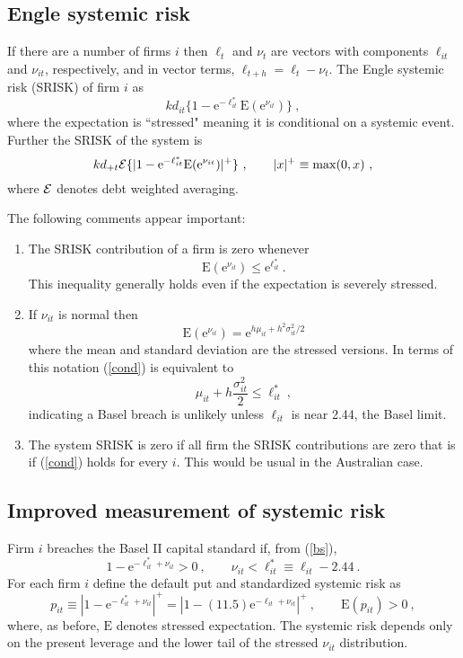 \documentclass[authoryear]{elsarticle}
\newcommand{\E}{\mathrm{E}}
\newcommand{\e}{\mathrm{e}}
\newcommand{\Ex}{{\cal E}}
\newcommand{\eref}[1]{(\ref{#1})}
\newcommand{\cq}{\ , \qquad}
\newcommand{\be}[1]{\begin{equation}\label{#1}}
\newcommand{\ee}{\end{equation}}
\begin{document}
\subsection{Engle systemic risk}
If there are a number of  firms $i$ then $\ell_t$ and $\nu_t$ are  vectors with components $\ell_{it}$ and $\nu_{it}$, respectively, and in vector terms, $\ell_{t+h}=\ell_t - \nu_t$.   The Engle systemic risk (SRISK) of  firm $i$ as 
\be{esrisk}
 kd_{it}\{1-\e^{-\ell^*_{it}}\E(\e^{\nu_{it}})\}\ ,
\ee
where the expectation is ``stressed" meaning it is conditional on a systemic event.  Further the SRISK of the system is
\be{essrisk}
kd_{+t}\Ex\{|1-\e^{-\ell^*_{it}}\E(\e^{\nu_{it}})|^+\}\cq |x|^+\equiv \max(0,x) \ ,
\ee
where $\Ex$ denotes debt weighted averaging.

The following comments appear important:
\begin{enumerate}
\item The SRISK contribution of a firm is zero whenever
\be{cond}
\E(\e^{\nu_{it}})\le\e^{\ell^*_{it}}\ .
\ee
This inequality generally holds even if the expectation is severely stressed. 
\item  If $\nu_{it}$ is normal then 
$$
\E(\e^{\nu_{it}}) = \e^{h\mu_{it} +h^2\sigma^2_{it}/2}
$$
where the mean and standard deviation are the stressed versions.  In terms of this notation \eref{cond}
is equivalent to
$$
\mu_{it} +h\frac{\sigma^2_{it}}{2}\le \ell_{it}^* \ ,
$$
indicating a Basel breach is unlikely unless $\ell_{it}$ is near 2.44, the Basel limit.

\item The system SRISK is zero if all firm the SRISK contributions are zero that is if \eref{cond} holds for every $i$.  This would be usual in the Australian case.
\end{enumerate}

\subsection{Improved measurement of systemic risk}

Firm $i$ breaches the Basel II capital standard if, from \eref{bs},
$$
1-\e^{-\ell^*_{it}+\nu_{it}} >0 \cq \nu_{it}< \ell_{it}^*\equiv \ell_{it}-2.44  \ .
$$
For each firm $i$ define the  default put and standardized systemic risk as 
\be{put}
p_{it}\equiv  |1-\e^{-\ell^*_{it}+\nu_{it}}|^+=\left|1-(11.5)\e^{-\ell_{it}+\nu_{it}}\right|^+\cq \E(p_{it})>0\ ,
\ee
where, as before, $\E$ denotes stressed expectation.  The systemic risk depends only on the present leverage  and the lower tail of the stressed $\nu_{it}$ distribution.    
\end{document}
